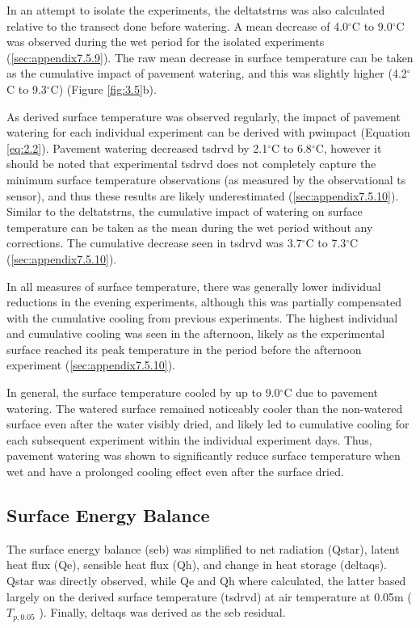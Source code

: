 \documentclass[final,3p,times,authoryear]{elsarticle}
\begin{document}
In an attempt to isolate the experiments, the \gls{deltatstrns} was also calculated relative to the transect done before watering. A mean decrease of 4.0$^{\circ}$C to 9.0$^{\circ}$C was observed during the wet period for the isolated experiments (\ref{sec:appendix7.5.9}). The raw mean decrease in surface temperature can be taken as the cumulative impact of pavement watering, and this was slightly higher (4.2$^{\circ}$C to 9.3$^{\circ}$C) (Figure \ref{fig:3.5}b).

As derived surface temperature was observed regularly, the impact of pavement
watering for each individual experiment can be derived with \gls{pwimpact} (Equation \ref{eq:2.2}). Pavement watering decreased \gls{tsdrvd} by 2.1$^{\circ}$C to 6.8$^{\circ}$C, however it should be noted that experimental \gls{tsdrvd} does not completely capture the minimum surface temperature observations (as measured by the observational \gls{ts} sensor), and thus these results are likely underestimated (\ref{sec:appendix7.5.10}). Similar to the \gls{deltatstrns}, the cumulative impact of watering on surface temperature can be taken as the mean during the wet period without any corrections. The cumulative decrease seen in \gls{tsdrvd} was 3.7$^{\circ}$C to 7.3$^{\circ}$C (\ref{sec:appendix7.5.10}).

In all measures of surface temperature, there was generally lower individual reductions
in the evening experiments, although this was partially compensated with the
cumulative cooling from previous experiments. The highest individual and cumulative
cooling was seen in the afternoon, likely as the experimental surface reached its peak
temperature in the period before the afternoon experiment (\ref{sec:appendix7.5.10}).

In general, the surface temperature cooled by up to 9.0$^{\circ}$C due to pavement watering.
The watered surface remained noticeably cooler than the non-watered surface even after
the water visibly dried, and likely led to cumulative cooling for each subsequent
experiment within the individual experiment days. Thus, pavement watering was shown
to significantly reduce surface temperature when wet and have a prolonged cooling
effect even after the surface dried.

\subsection{Surface Energy Balance}\label{sec:discussion3.4}

The surface energy balance (\gls{seb}) was simplified to net radiation (\gls{Qstar}), latent heat flux (\gls{Qe}), sensible heat flux (\gls{Qh}), and change in heat storage (\gls{deltaqs}). \gls{Qstar} was directly observed, while \gls{Qe} and \gls{Qh} where calculated, the latter based largely on the derived surface temperature (\gls{tsdrvd}) at air temperature at 0.05m ($T_{p,0.05}$ ). Finally, \gls{deltaqs} was derived as the \gls{seb} residual.
\end{document}
